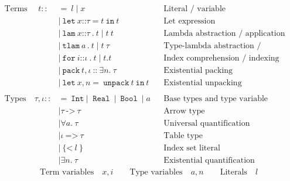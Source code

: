 \documentclass[12pt]{article}
\newcommand{\annot}[1]{\texttt{::} #1}
\newcommand{\ttt}[1]{~\texttt{#1}~}
\begin{document}
\vspace{-0.5cm}

\begin{huge}
\begin{align*}
\text{Terms } \quad t ::&=~
l  \mid x
      && \text{Literal / variable} \\
&\mid \ttt{let} x \annot{\tau} = t \ttt{in} t
        && \text{Let expression} \\
&\mid \ttt{lam} x \annot{\tau} \ttt {.} t
   \mid  t ~ t
    && \text{Lambda abstraction / application} \\
&\mid \ttt{tlam} a \, . ~ t
   \mid t ~ \tau
    && \text{Type-lambda abstraction / application} \\
&\mid \ttt{for} i \annot{\iota}  \ttt {.} t
   \mid t.t
    && \text{Index comprehension / indexing} \\
&\mid \ttt{pack} t, \iota \ttt{::} \exists n. ~ \tau
       && \text{Existential packing} \\
&\mid \ttt{let} x, n = \ttt{unpack} t \ttt{in} t
       && \text{Existential unpacking}
\\ \\
\text{Types} \quad \tau, \iota ::&=
 \ttt{Int} | \ttt{ Real} \mid \ttt{Bool} \mid a
      && \text{Base types and type variable} \\
&\mid \tau   \ttt{->} \tau  && \text{Arrow type} \\
&\mid \forall a. ~ \tau
    && \text{Universal quantification} \\
&\mid \iota \ttt{=>} \tau  && \text{Table type} \\
&\mid \ttt{\{<}l\ttt{\}} && \text{Index set literal} \\
&\mid \exists n. ~ \tau
    && \text{Existential quantification}
\end{align*}
%
\begin{align*}
\text{Term variables} \quad x, i \qquad
\text{Type variables} \quad a, n \qquad
\text{Literals} \quad l
\end{align*}
\end{huge}
\end{document}
